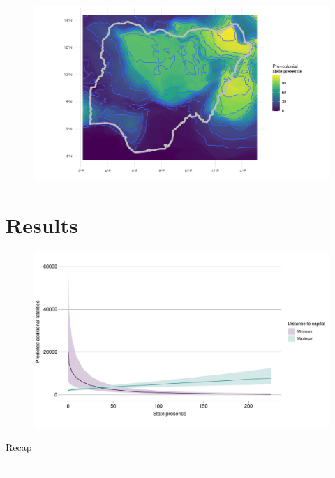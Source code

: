 \documentclass{beamer}
\begin{document}
\begin{frame} %
	\begin{figure}
		\includegraphics[width=\linewidth]{../R/Output/nigeria.pdf}
	\end{figure}
\end{frame}

\section{Results}

\begin{frame}
	\begin{figure}
		\includegraphics[width=\linewidth]{"../R/Output/interdeathszinbplot.pdf"}
	\end{figure}
\end{frame}

\begin{frame}{Recap}

\begin{itemize}
	\item[-]  \pause
\end{itemize}	

\end{frame}
\end{document}
